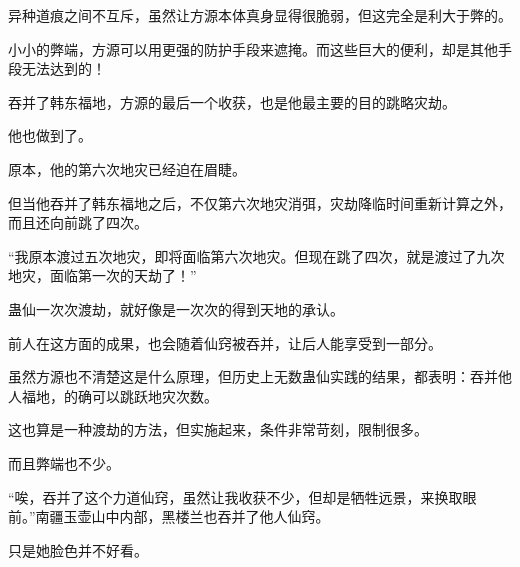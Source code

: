 \begin{this_body}
异种道痕之间不互斥，虽然让方源本体真身显得很脆弱，但这完全是利大于弊的。

小小的弊端，方源可以用更强的防护手段来遮掩。而这些巨大的便利，却是其他手段无法达到的！

吞并了韩东福地，方源的最后一个收获，也是他最主要的目的跳略灾劫。

他也做到了。

原本，他的第六次地灾已经迫在眉睫。

但当他吞并了韩东福地之后，不仅第六次地灾消弭，灾劫降临时间重新计算之外，而且还向前跳了四次。

“我原本渡过五次地灾，即将面临第六次地灾。但现在跳了四次，就是渡过了九次地灾，面临第一次的天劫了！”

蛊仙一次次渡劫，就好像是一次次的得到天地的承认。

前人在这方面的成果，也会随着仙窍被吞并，让后人能享受到一部分。

虽然方源也不清楚这是什么原理，但历史上无数蛊仙实践的结果，都表明：吞并他人福地，的确可以跳跃地灾次数。

这也算是一种渡劫的方法，但实施起来，条件非常苛刻，限制很多。

而且弊端也不少。

“唉，吞并了这个力道仙窍，虽然让我收获不少，但却是牺牲远景，来换取眼前。”南疆玉壶山中内部，黑楼兰也吞并了他人仙窍。

只是她脸色并不好看。

\end{this_body}

